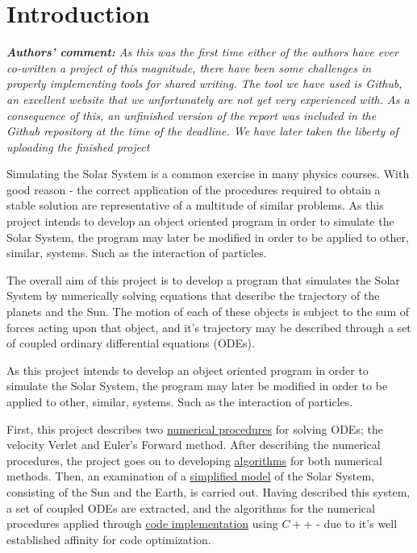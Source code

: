 \documentclass[%
oneside,                 %
final,                   %
10pt]{article}
\begin{document}
\section{Introduction}
\textit{\textbf{Authors' comment:} As this was the first time either of the authors have ever co-written a project of this magnitude, there have been some challenges in properly implementing tools for shared writing. The tool we have used is Github, an excellent website that we unfortunately are not yet very experienced with. As a consequence of this, an unfinished version of the report was included in the Github repository at the time of the deadline. We have later taken the liberty of uploading the finished project} \newline

Simulating the Solar System is a common exercise in many physics courses. With good reason - the correct application of the procedures required to obtain a stable solution are representative of a multitude of similar problems. As this project intends to develop an object oriented program in order to simulate the Solar System, the program may later be modified in order to be applied to other, similar, systems. Such as the interaction of particles. \newline

The overall aim of this project is to develop a program that simulates the Solar System by numerically solving equations that describe the trajectory of the planets and the Sun. The motion of each of these objects is subject to the sum of forces acting upon that object, and it's trajectory may be described through a set of coupled ordinary differential equations (ODEs). \newline

As this project intends to develop an object oriented program in order to simulate the Solar System, the program may later be modified in order to be applied to other, similar, systems. Such as the interaction of particles. \newline

First, this project describes two \hyperref[sec:NPs]{numerical procedures} for solving ODEs; the velocity Verlet and Euler's Forward method. After describing the numerical procedures, the project goes on to developing \hyperref[sec:NPalgo]{algorithms} for both numerical methods. Then, an examination of a \hyperref[subsec:SEsys]{simplified model} of the Solar System, consisting of the Sun and the Earth, is carried out. Having described this system, a set of coupled ODEs are extracted, and the algorithms for the numerical procedures applied through \hyperref[subsec:algoimpl]{code implementation} using $C++$ - due to it's well established affinity for code optimization. \newline
\end{document}
